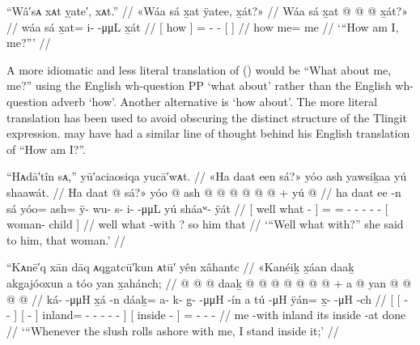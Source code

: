 \ex\label{ex:91-133-how-am-i-me}%
%
\begingl
	\glpreamble	“Wâ′sᴀ xᴀt ỵate′, xᴀt.” //
	\glpreamble	«\!Wáa sá x̱at ÿatee, x̱át?\!» //
	\gla	{} Wáa sá {} x̱at @  @ {} @ {} {} x̱át?\!» {} //
	\glb	{} wáa sá {} x̱at= i-  -μμL {} x̱át {} //
	\glc	{}[ how  {}] = -  -
		{}[  {}] //
	\gld	{} how  {} me=  {} {}
		{} me {} //
	\glft	‘“How am I, me?”’
		//
\endgl
\xe

A more idiomatic and less literal translation of (\lastx) would be “What about me, me?” using the English wh-question PP ‘what about’ rather than the English wh-question adverb ‘how’.
Another alternative is ‘how about’.
The more literal translation has been used to avoid obscuring the distinct structure of the Tlingit expression.
\citeauthor{swanton:1909} may have had a similar line of thought behind his English translation of “How am I?”.

\ex\label{ex:91-134-what-with-she-said-to-him}%
%
\begingl
	\glpreamble	“Hᴀdā′tîn sᴀ,” yū′aciaosiqa yucā′wᴀt. //
	\glpreamble	«\!Ha daat een sá?\!» yóo ash yawsiḵaa yú shaawát. //
	\gla	{} Ha daat  @ {} sá?\!» {} 
		yóo @ ash @  @ {} @ {} @ {} @ {} @ {} +
		{} yú  @ {} {}  //
	\glb	{} ha daat ee -n sá {}
		yóo= ash= ÿ- wu- s- i-  -μμL
		{} yú sháaʷ- ÿát {} //
	\glc	{}[ well what  -  {}]
		= = - - - -
			 -
		{}[  woman- child {}] //
	\gld	{} well what {} -with ? {}
		so him  {} {} {} {} {}
		{} that  {} {} //
	\glft	‘“Well what with?” she said to him, that woman.’
		//
\endgl
\xe

\ex\label{ex:91-135-slush-rolls-ashore-stand-inside}%
%
\begingl
	\glpreamble	“Kᴀnē′q xān dāq ᴀqg̣atcū′kun ᴀtū′ yên xâhantc //
	\glpreamble	«\!Kanéiḵ x̱áan daaḵ akg̱ajóoxun a tóo yan x̱ahánch; //
	\gla	{} {}  @ {} @ {} {} {}  @ {} {}
			daaḵ @  @ {} @ {} @ {} @ {} @ {} @ {} {} +
		{} a  @ {} {}
		yan @  @ {} @ {} @ {} //
	\glb	{} {} ká-  -μμH {} {} x̱á -n {}
			dáaḵ= a- k- {} g̱-  -μμH -ín {}
		{} a tú -μH {}
		ÿán= x̱-  -μH -ch //
	\glc	{}[ {}[ -  - {}]
			{}[  - {}]
			inland= - - \· -
				 - - {}]
		{}[  inside - {}]
		= -  - - //
	\gld	{} {}  {} {} {} {} me -with {}
			inland  {} {} {} {} {} {} {}
		{} its inside -at {}
		done  {} {} {} //
	\glft	‘“Whenever the slush rolls ashore with me, I stand inside it;’
		//
\endgl
\xe


